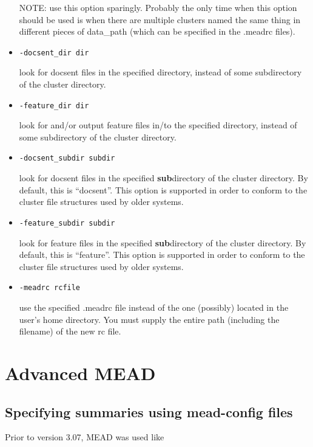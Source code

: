 \documentclass[10pt]{article}
\begin{document}
\begin{itemize}
  NOTE: use this option sparingly.  Probably the only time when this
  option should be used is when there are multiple clusters named the same
  thing in different pieces of data\_path (which can be specified in the
  .meadrc files).

\item \verb|-docsent_dir dir|

  look for docsent files in the specified directory, instead of
  some subdirectory of the cluster directory.

\item \verb|-feature_dir dir|

  look for and/or output feature files in/to the specified directory,
  instead of some subdirectory of the cluster directory.

\item \verb|-docsent_subdir subdir|

  look for docsent files in the specified {\bf sub}directory of the
  cluster directory.  By default, this is ``docsent''.  This
  option is supported in order to conform to the cluster file 
  structures used by older systems.

\item \verb|-feature_subdir subdir|

  look for feature files in the specified {\bf sub}directory of the
  cluster directory.  By default, this is ``feature''.  This
  option is supported in order to conform to the cluster file
  structures used by older systems.

\item \verb|-meadrc rcfile|

  use the specified .meadrc file instead of the one (possibly)
  located in the user's home directory.  You must supply the entire
  path (including the filename) of the new rc file.

\end{itemize}






\section{Advanced MEAD}


\subsection{Specifying summaries using mead-config files}

Prior to version 3.07, MEAD was used like
\end{document}
